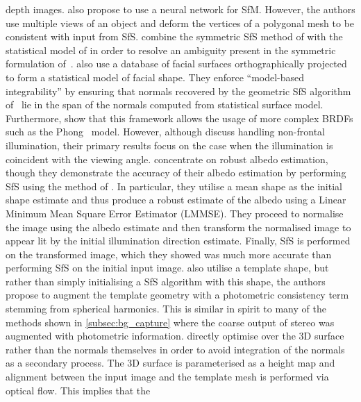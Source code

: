 depth images.
\citet{fanany2004neural,fanany2002analysis} also propose to use a neural network
for SfM. However, the authors use multiple views of an object and deform
the vertices of a polygonal mesh to be consistent with input from SfS.
\citet{dovgard2004statistical} combine the symmetric SfS method of
\citet{yilmaz2002estimation} with the statistical model of
\citet{atick1996statistical} in order to resolve an ambiguity present in
the symmetric formulation of~\cite{yilmaz2002estimation}.
\citet{smith2010estimating} also use a database of facial surfaces
orthographically projected to form a statistical model of facial shape. They
enforce ``model-based integrability'' by ensuring that normals recovered
by the geometric SfS algorithm of~\cite{worthington1999new,Smith:2007eb} lie
in the span of the normals computed from statistical surface model. Furthermore,
\citet{smith2010estimating} show that this framework allows the usage of
more complex BRDFs such as the Phong~\cite{tuong1973illumination} model.
However, although \citet{smith2010estimating} discuss handling non-frontal
illumination, their primary results focus on the case when the illumination
is coincident with the viewing angle.
\citet{biswas2009robust} concentrate on robust albedo estimation, though they
demonstrate the accuracy of their albedo estimation by performing SfS using the
method of \citet{ping1994shape}. In particular, they utilise a mean shape as the
initial shape estimate and thus produce a robust estimate of the albedo using a
Linear Minimum Mean Square Error Estimator (LMMSE). They proceed to normalise
the image using the albedo estimate and then transform the normalised image to
appear lit by the initial illumination direction estimate. Finally, SfS is
performed on the transformed image, which they showed was much more accurate
than performing SfS on the initial input image.
\citet{kemelmacher2011facereconstruction} also utilise a template shape, but
rather than simply initialising a SfS algorithm with this shape, the authors
propose to augment the template geometry with a photometric consistency term
stemming from spherical harmonics. This is similar in spirit to many of the
methods shown in \cref{subsec:bg_capture} where the coarse output of stereo was
augmented with photometric information.
\citet{kemelmacher2011facereconstruction} directly optimise over the 3D
surface rather than the normals themselves in order to avoid integration of the
normals as a secondary process. The 3D surface
is parameterised as a height map and alignment between the input
image and the template mesh is performed via optical flow. This implies that the
